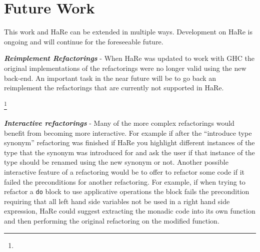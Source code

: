 \DIFaddend \section{Future Work}
This work and HaRe can be extended in multiple ways. Development on HaRe is ongoing and will continue for the foreseeable future. 

\textit{\textbf{Reimplement Refactorings}} - When HaRe was updated to work with GHC the original implementations of the refactorings were no longer valid using the new back-end. An important task in the near future will be to go back an reimplement the refactorings that are currently not supported in HaRe.  

\DIFdelbegin \textit{\textbf{}%
} %
\textit{}%
\footnote{%
} %
\addtocounter{footnote}{-1}%

\DIFdelend \textit{\textbf{Interactive refactorings}} - Many of the more complex refactorings would benefit from becoming more interactive. For example if after the ``introduce type synonym'' refactoring was finished if HaRe you highlight different instances of the type that the synonym was introduced for and ask the user if that instance of the type should be renamed using the new synonym or not. Another possible interactive feature of a refactoring would be to offer to refactor some code if it failed the preconditions for another refactoring. For example, if when trying to refactor a \texttt{do} block to use applicative operations the block fails the precondition requiring that all left hand side variables not be used in a right hand side expression, HaRe could suggest extracting the monadic code into its own function and then performing the original refactoring on the modified function.

